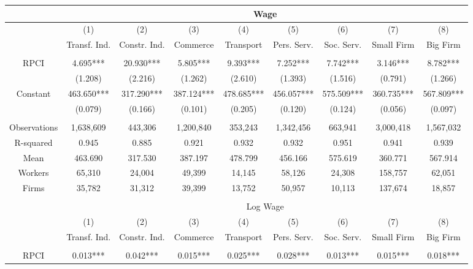 \begin{tabular}{c|cccccccc}
\toprule
\toprule
      & \multicolumn{8}{c}{Wage} \\
\midrule
      & (1)   & (2)   & (3)   & (4)   & (5)   & (6)   & (7)   & (8) \\
      & Transf. Ind. & Constr. Ind. & Commerce & Transport & Pers. Serv. & Soc. Serv. & Small Firm & Big Firm \\
\midrule
      &       &       &       &       &       &       &       &  \\
RPCI  & 4.695*** & 20.930*** & 5.805*** & 9.393*** & 7.252*** & 7.742*** & 3.146*** & 8.782*** \\
      & (1.208) & (2.216) & (1.262) & (2.610) & (1.393) & (1.516) & (0.791) & (1.266) \\
Constant & 463.650*** & 317.290*** & 387.124*** & 478.685*** & 456.057*** & 575.509*** & 360.735*** & 567.809*** \\
      & (0.079) & (0.166) & (0.101) & (0.205) & (0.120) & (0.124) & (0.056) & (0.097) \\
      &       &       &       &       &       &       &       &  \\
\midrule
Observations & 1,638,609 & 443,306 & 1,200,840 & 353,243 & 1,342,456 & 663,941 & 3,000,418 & 1,567,032 \\
R-squared & 0.945 & 0.885 & 0.921 & 0.932 & 0.932 & 0.951 & 0.941 & 0.939 \\
Mean  & 463.690 & 317.530 & 387.197 & 478.799 & 456.166 & 575.619 & 360.771 & 567.914 \\
Workers & 65,310 & 24,004 & 49,399 & 14,145 & 58,126 & 24,308 & 158,757 & 62,051 \\
Firms & 35,782 & 31,312 & 39,399 & 13,752 & 50,957 & 10,113 & 137,674 & 18,857 \\
\midrule
\midrule
\multicolumn{1}{r}{} &       &       &       &       &       &       &       &  \\
\midrule
\midrule
      & \multicolumn{8}{c}{Log Wage} \\
\midrule
      & (1)   & (2)   & (3)   & (4)   & (5)   & (6)   & (7)   & (8) \\
      & Transf. Ind. & Constr. Ind. & Commerce & Transport & Pers. Serv. & Soc. Serv. & Small Firm & Big Firm \\
\midrule
      &       &       &       &       &       &       &       &  \\
RPCI  & 0.013*** & 0.042*** & 0.015*** & 0.025*** & 0.028*** & 0.013*** & 0.015*** & 0.018*** \\

\end{tabular}
